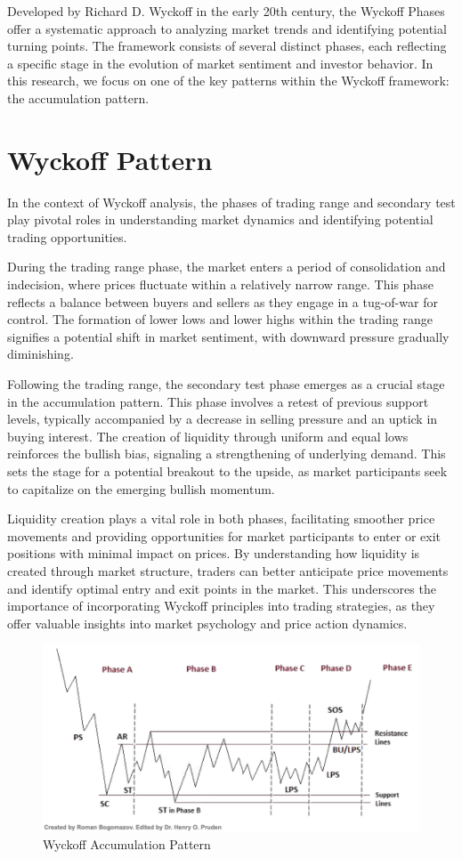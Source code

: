 \documentclass{article}
\begin{document}
Developed by Richard D. Wyckoff in the early 20th century, the Wyckoff Phases offer a systematic approach to analyzing market trends and identifying potential turning points. The framework consists of several distinct phases, each reflecting a specific stage in the evolution of market sentiment and investor behavior. In this research, we focus on one of the key patterns within the Wyckoff framework: the accumulation pattern.



\section{Wyckoff Pattern}
In the context of Wyckoff analysis, the phases of trading range and secondary test play pivotal roles in understanding market dynamics and identifying potential trading opportunities.

During the trading range phase, the market enters a period of consolidation and indecision, where prices fluctuate within a relatively narrow range. This phase reflects a balance between buyers and sellers as they engage in a tug-of-war for control. The formation of lower lows and lower highs within the trading range signifies a potential shift in market sentiment, with downward pressure gradually diminishing.

Following the trading range, the secondary test phase emerges as a crucial stage in the accumulation pattern. This phase involves a retest of previous support levels, typically accompanied by a decrease in selling pressure and an uptick in buying interest. The creation of liquidity through uniform and equal lows reinforces the bullish bias, signaling a strengthening of underlying demand. This sets the stage for a potential breakout to the upside, as market participants seek to capitalize on the emerging bullish momentum.

Liquidity creation plays a vital role in both phases, facilitating smoother price movements and providing opportunities for market participants to enter or exit positions with minimal impact on prices. By understanding how liquidity is created through market structure, traders can better anticipate price movements and identify optimal entry and exit points in the market. This underscores the importance of incorporating Wyckoff principles into trading strategies, as they offer valuable insights into market psychology and price action dynamics.

\begin{figure}[ht]
	\centering
	\includegraphics[width=0.7\linewidth]{visuals/acc_visual}
	\caption[]{Wyckoff Accumulation Pattern}
	\label{fig:accvisual}
\end{figure}
\end{document}
